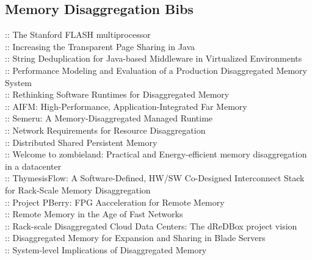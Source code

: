 
\subsection{Memory Disaggregation Bibs}

\cite{flash.isca94} :: The Stanford FLASH multiprocessor \\
\cite{javatps.ispass13} :: Increasing the Transparent Page Sharing in Java \\
\cite{javastringdedup.vee14} :: String Deduplication for Java-based Middleware in Virtualized Environments \\
\cite{disaggmemperfmodel.memsys20} :: Performance Modeling and Evaluation of a Production Disaggregated Memory System \\
\cite{dissmemruntime.asplos21} :: Rethinking Software Runtimes for Disaggregated Memory \\
\cite{aifm.osdi20} :: AIFM: High-Performance, Application-Integrated Far Memory \\
\cite{semeru.osdi20} :: Semeru: A Memory-Disaggregated Managed Runtime \\
\cite{resdisagg.osdi16} :: Network Requirements for Resource Disaggregation \\
\cite{dspm.socc17} :: Distributed Shared Persistent Memory \\
\cite{zombieland.eurosys18} :: Welcome to zombieland: Practical and Energy-efficient memory disaggregation in a datacenter \\
\cite{thymesisflow.micro20} :: ThymesisFlow: A Software-Defined, HW/SW Co-Designed Interconnect Stack for Rack-Scale Memory Disaggregation \\
\cite{pberry.hotos19} :: Project PBerry: FPG Aacceleration for Remote Memory \\
\cite{fastnetdisagg.socc17} :: Remote Memory in the Age of Fast Networks \\
\cite{dredbox.date16} :: Rack-scale Disaggregated Cloud Data Centers: The dReDBox project vision \\
\cite{memblade.isca09} :: Disaggregated Memory for Expansion and Sharing in Blade Servers \\
\cite{sysdisaggmem.hpca12} :: System-level Implications of Disaggregated Memory \\
